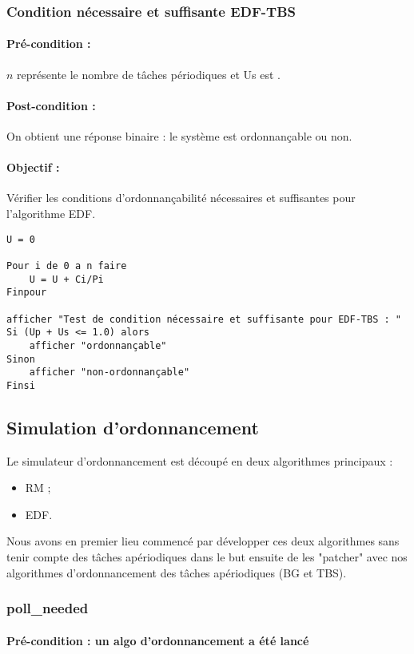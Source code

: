 			\subsubsection{Condition nécessaire et suffisante EDF-TBS}
				\paragraph{Pré-condition :} $n$ représente le nombre de tâches périodiques et Us est .
				\paragraph{Post-condition :} On obtient une réponse binaire : le système est ordonnançable ou non.
				\paragraph{Objectif :} Vérifier les conditions d'ordonnançabilité nécessaires et suffisantes pour l'algorithme EDF.
					\begin{lstlisting}
U = 0

Pour i de 0 a n faire
    U = U + Ci/Pi
Finpour
					
afficher "Test de condition nécessaire et suffisante pour EDF-TBS : "
Si (Up + Us <= 1.0) alors
	afficher "ordonnançable"
Sinon
	afficher "non-ordonnançable"
Finsi
					\end{lstlisting}
	
		\subsection{Simulation d'ordonnancement}
			Le simulateur d'ordonnancement est découpé en deux algorithmes principaux :
			\begin{itemize}
				\item RM ;
				\item EDF.
			\end{itemize}
			
			Nous avons en premier lieu commencé par développer ces deux algorithmes sans tenir compte des tâches apériodiques dans le but ensuite de les "patcher" avec nos algorithmes d'ordonnancement des tâches apériodiques (BG et TBS).
			
			
			\subsubsection{poll\_needed}
				\paragraph{Pré-condition : un algo d'ordonnancement a été lancé} 
